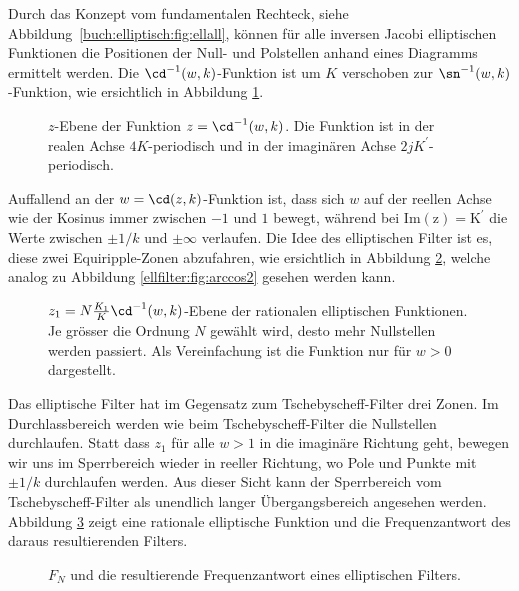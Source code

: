 Durch das Konzept vom fundamentalen Rechteck,
siehe Abbildung~\ref{buch:elliptisch:fig:ellall},
können für alle inversen Jacobi elliptischen Funktionen die Positionen der Null- und Polstellen anhand eines Diagramms ermittelt werden.
%
%
Die $\cd^{-1}(w, k)$-Funktion ist um $K$ verschoben zur $\sn^{-1}(w, k)$-Funktion, wie ersichtlich in Abbildung \ref{ellfilter:fig:cd}.
\begin{figure}
    \centering
    
    \caption{
        $z$-Ebene der Funktion $z = \cd^{-1}(w, k)$.
        Die Funktion ist in der realen Achse $4K$-periodisch und in der imaginären Achse $2jK^\prime$-periodisch.
    }
    \label{ellfilter:fig:cd}
\end{figure}
Auffallend an der $w = \cd(z, k)$-Funktion ist, dass sich $w$ auf der reellen Achse wie der Kosinus immer zwischen $-1$ und $1$ bewegt, während bei $\mathrm{Im(z) = K^\prime}$ die Werte zwischen $\pm 1/k$ und $\pm \infty$ verlaufen.
Die Idee des elliptischen Filter ist es, diese zwei Equiripple-Zonen abzufahren, wie ersichtlich in Abbildung \ref{ellfilter:fig:cd2}, welche analog zu Abbildung \ref{ellfilter:fig:arccos2} gesehen werden kann.
%
%
\begin{figure}
    \centering
    
    \caption{
        $z_1=N\frac{K_1}{K}\cd^{-1}(w, k)$-Ebene der rationalen elliptischen Funktionen.
        Je grösser die Ordnung $N$ gewählt wird, desto mehr Nullstellen werden passiert.
        Als Vereinfachung ist die Funktion nur für $w>0$ dargestellt.
    }
    \label{ellfilter:fig:cd2}
\end{figure}
Das elliptische Filter hat im Gegensatz zum Tschebyscheff-Filter drei Zonen.
Im Durchlassbereich werden wie beim Tschebyscheff-Filter die Nullstellen durchlaufen.
Statt dass $z_1$ für alle $w>1$ in die imaginäre Richtung geht, bewegen wir uns im Sperrbereich wieder in reeller Richtung, wo Pole und Punkte mit $\pm 1/k$ durchlaufen werden.
Aus dieser Sicht kann der Sperrbereich vom Tschebyscheff-Filter als unendlich langer Übergangsbereich angesehen werden.
Abbildung \ref{ellfilter:fig:elliptic_freq} zeigt eine rationale elliptische Funktion und die Frequenzantwort des daraus resultierenden Filters.
\begin{figure}
    \centering
    
    \caption{$F_N$ und die resultierende Frequenzantwort eines elliptischen Filters.}
    \label{ellfilter:fig:elliptic_freq}
\end{figure}


